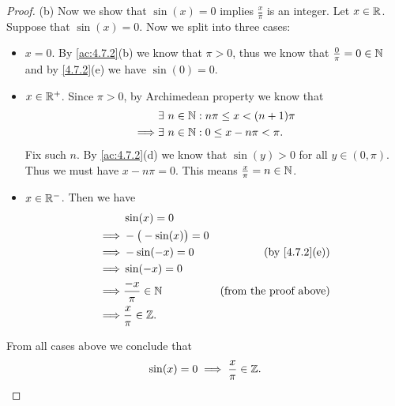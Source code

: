 \begin{proof}{(b)}
  Now we show that \(\sin(x) = 0\) implies \(\frac{x}{\pi}\) is an integer.
  Let \(x \in \mathbb{R}\).
  Suppose that \(\sin(x) = 0\).
  Now we split into three cases:
  \begin{itemize}
    \item \(x = 0\).
          By \cref{ac:4.7.2}(b) we know that \(\pi > 0\), thus we know that \(\frac{0}{\pi} = 0 \in \mathbb{N}\) and by \cref{4.7.2}(e) we have \(\sin(0) = 0\).
    \item \(x \in \mathbb{R}^+\).
          Since \(\pi > 0\), by Archimedean property we know that
          \begin{align*}
                     & \exists\ n \in \mathbb{N} : n \pi \leq x < (n + 1) \pi \\
            \implies & \exists\ n \in \mathbb{N} : 0 \leq x - n \pi < \pi.
          \end{align*}
          Fix such \(n\).
          By \cref{ac:4.7.2}(d) we know that \(\sin(y) > 0\) for all \(y \in (0, \pi)\).
          Thus we must have \(x - n \pi = 0\).
          This means \(\frac{x}{\pi} = n \in \mathbb{N}\).
    \item \(x \in \mathbb{R}^-\).
          Then we have
          \begin{align*}
                     & \sin(x) = 0                                             \\
            \implies & -\big(-\sin(x)\big) = 0                                 \\
            \implies & -\sin(-x) = 0           & \text{(by \cref{4.7.2}(e))}   \\
            \implies & \sin(-x) = 0                                            \\
            \implies & \frac{-x}{\pi} \in \N   & \text{(from the proof above)} \\
            \implies & \frac{x}{\pi} \in \Z.
          \end{align*}
  \end{itemize}
  From all cases above we conclude that
  \[
    \sin(x) = 0 \implies \frac{x}{\pi} \in \mathbb{Z}.
  \]
\end{proof}

